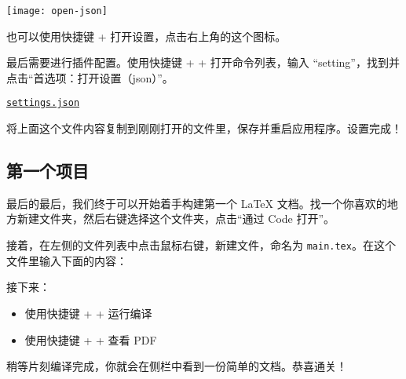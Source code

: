 \begin{marginfigure}
  \centering
  \texttt{[image: open-json]}
  \caption{也可以使用快捷键  + \kbd{,} 打开设置，点击右上角的这个图标。}
  \end{marginfigure}

最后需要进行插件配置。使用快捷键  +  +  打开命令列表，输入 “setting”，找到并点击“首选项：打开设置（json）”。

\medskip
\href{https://git.nju.edu.cn/atXYblip/install-latex-instantly/-/raw/main/.vscode/settings.json}{\faFile*[regular] \texttt{settings.json}}
\medskip

将上面这个文件内容复制到刚刚打开的文件里，保存并重启应用程序。设置完成！

\subsection{第一个项目}

\begin{widepar}
最后的最后，我们终于可以开始着手构建第一个 \LaTeX{} 文档。找一个你喜欢的地方新建文件夹，然后右键选择这个文件夹，点击“通过 Code 打开”。

接着，在左侧的文件列表中点击鼠标右键，新建文件，命名为 \texttt{main.tex}。在这个文件里输入下面的内容：
\end{widepar}


\begin{widepar}

接下来：
\begin{itemize}
  \item 使用快捷键  +  +  运行编译
  \item 使用快捷键  +  +  查看 PDF
\end{itemize}

稍等片刻编译完成，你就会在侧栏中看到一份简单的文档。恭喜通关！

\bigskip\bigskip

\begin{center}
\end{center}
\bigskip

\end{widepar}
